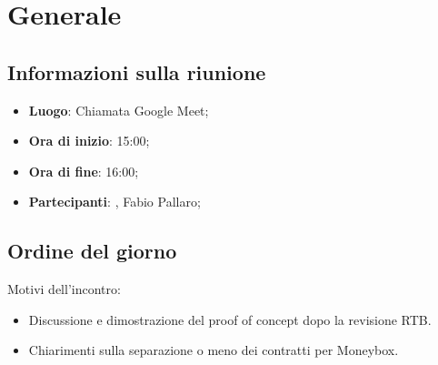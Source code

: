 \section{Generale}

\vspace{10pt}


\subsection{Informazioni sulla riunione}
\begin{itemize}
	\item \textbf{Luogo}: Chiamata Google Meet;
	\item \textbf{Ora di inizio}: 15:00;
	\item \textbf{Ora di fine}: 16:00;
	\item \textbf{Partecipanti}: \team, Fabio Pallaro;
\end{itemize}

\vspace{5pt}

\subsection{Ordine del giorno}
Motivi dell'incontro:
\begin{itemize}
	\item Discussione e dimostrazione del proof of concept dopo la revisione RTB\glo. 
	\item Chiarimenti sulla separazione o meno dei contratti per Moneybox\glo.
\end{itemize}
